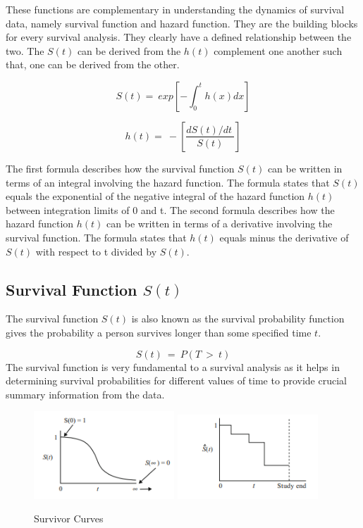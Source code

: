 \documentclass[12pt]{report} %
\begin{document}
These functions are complementary in understanding the dynamics of survival data, namely survival function and hazard function. They are the building blocks for every survival analysis. They clearly have a defined relationship between the two. The \(S\left(t\right)\) can be derived from the \(h\left(t\right)\) complement one another such that, one can be derived from the other.

\[S\left(t\right)=\ exp\left[-\int_{0}^{t}{h(x)dx}\right]\]

\[h\left(t\right)=\ -\left[\frac{dS\left(t\right)/dt\ }{S(t)}\right]\]



The first formula describes how the survival function \(S\left(t\right)\) can be written in terms of an integral involving the hazard function. The formula states that \(S\left(t\right) \)equals the exponential of the negative integral of the hazard function \(h\left(t\right) \) between integration limits of 0 and t. 
The second formula describes how the hazard function \(h\left(t\right) \) can be written in terms of a derivative involving the survival function. The formula states that \( h\left(t\right)\) equals minus the derivative of \(S\left(t\right) \) with respect to t divided by \(S\left(t\right)\).


\subsection{\texorpdfstring{Survival Function \( S(t) \)}{Survival Function S(t)}}
The survival function \(S\left(t\right) \) is also known as the survival probability function gives the probability a person survives longer than some specified time \( t\).

\[S(t)\ =\ P(T\ >\ t)\]
The survival function is very fundamental to a survival analysis as it helps in determining survival probabilities for different values of time  to provide crucial summary information from the data.
\begin{figure}[H]
    \centering
    \includegraphics[width=0.47\textwidth]{Figure 3/3.31.png}
    \hfill
    \includegraphics[width=0.47\textwidth]{Figure 3/3.32.png}
    \caption{Survivor Curves}
    \label{Figure 3.3}
\end{figure}
\end{document}

